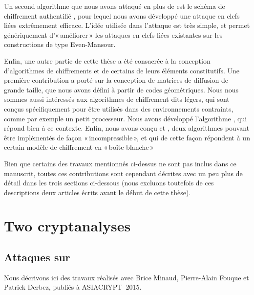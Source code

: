 Un second algorithme que nous avons attaqué en plus de \shaone est le schéma de chiffrement authentifié \proestotr, pour lequel nous avons développé une attaque en clefs liées
extrêmement efficace. L'idée utilisée dans l'attaque est très simple, et permet génériquement d'«\,améliorer\,» les attaques en clefs liées existantes sur les constructions
de type Even-Mansour.

\medskip

Enfin, une autre partie de cette thèse a été consacrée à la conception d'algorithmes de chiffrements et de certains de leurs éléments constitutifs.
Une première contribution a porté sur la conception de matrices de diffusion de grande taille, que nous avons défini à partir de codes géométriques.
Nous nous sommes aussi intéressés aux algorithmes de chiffrement dits légers, qui sont conçus spécifiquement pour être utilisés dans des environnements
contraints, comme par exemple un petit processeur. Nous avons développé l'algorithme \fly, qui répond bien à ce contexte.
Enfin, nous avons conçu \pc et \cdb, deux algorithmes pouvant être implémentés de façon «\,incompressible\,», et qui de cette façon répondent à un certain modèle
de chiffrement en «\,boîte blanche\,» 

\bigskip

Bien que certains des travaux mentionnés ci-dessus ne sont pas inclus dans ce manuscrit, toutes ces contributions sont cependant
décrites avec un peu plus de détail dans les trois sections ci-dessous (nous excluons toutefois de ces descriptions deux articles écrits avant le début de cette thèse).

\section[Deux cryptanalyses]{Two cryptanalyses}

\subsection{Attaques sur \asasa \cite{DBLP:conf/asiacrypt/MinaudDFK15}}
Nous décrivons ici des travaux réalisés avec Brice Minaud, Pierre-Alain Fouque et Patrick Derbez, publiés à ASIACRYPT~2015.

\medskip

